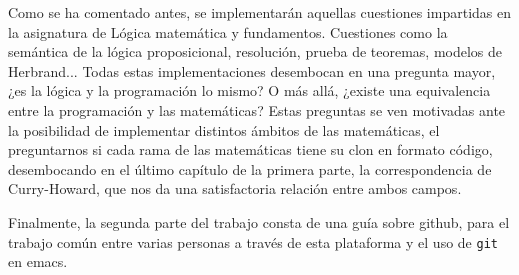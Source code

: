 Como se ha comentado antes, se implementarán aquellas cuestiones impartidas en la asignatura de Lógica matemática y fundamentos. Cuestiones como la semántica de la lógica proposicional, resolución, prueba de teoremas, modelos de Herbrand... Todas estas implementaciones desembocan en una pregunta mayor, ¿es la lógica y la programación lo mismo? O más allá, ¿existe una equivalencia entre la programación y las matemáticas? Estas preguntas se ven motivadas ante la posibilidad de implementar distintos ámbitos de las matemáticas, el preguntarnos si cada rama de las matemáticas tiene su clon en formato código, desembocando en el último capítulo de la primera parte, la correspondencia de Curry-Howard, que nos da una satisfactoria relación entre ambos campos.

Finalmente, la segunda parte del trabajo consta de una guía sobre github, para el trabajo común entre varias personas a través de esta plataforma y el uso de \texttt{git} en emacs. 

